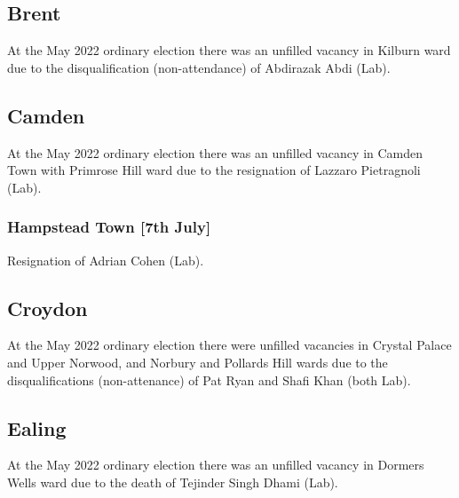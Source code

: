 \documentclass[a4paper,openany]{book}
\begin{document}
\begin{resultsiii}
\subsection*{Brent}

At the May 2022 ordinary election there was an unfilled vacancy in Kilburn ward due to the disqualification (non-attendance) of Abdirazak Abdi (Lab).%

\subsection*{Camden}

At the May 2022 ordinary election there was an unfilled vacancy in Camden Town with Primrose Hill ward due to the resignation of Lazzaro Pietragnoli (Lab).%

\subsubsection*{Hampstead Town \hspace*{\fill}\nolinebreak[1]%
	\enspace\hspace*{\fill}
	[7th July]}


Resignation of Adrian Cohen (Lab).

\subsection*{Croydon}

At the May 2022 ordinary election there were unfilled vacancies in Crystal Palace and Upper Norwood, and Norbury and Pollards Hill wards due to the disqualifications (non-attenance) of Pat Ryan and Shafi Khan (both Lab).%
%

\subsection*{Ealing}

At the May 2022 ordinary election there was an unfilled vacancy in Dormers Wells ward due to the death of Tejinder Singh Dhami (Lab).%


\end{resultsiii}
\end{document}
